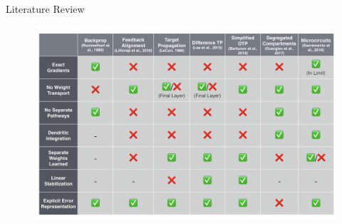 \documentclass[dvipsnames, usenames]{beamer}
\begin{document}
\begin{frame}{Literature Review}
\vspace{-0.5cm}

\begin{figure}[H]
	\centering
	\includegraphics[width=\textwidth]{../figures/report/lit_rev}
\end{figure}

\end{frame}

\end{document}
